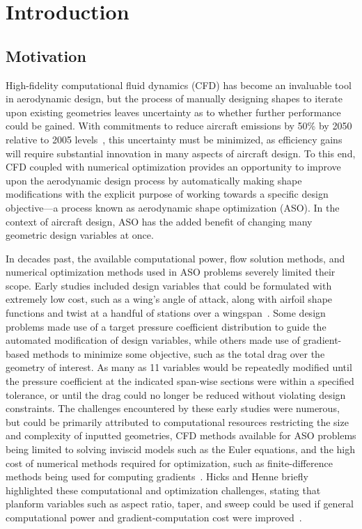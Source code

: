 \chapter{Introduction}
\section{Motivation}
\label{ssec:motivation}
High-fidelity computational fluid dynamics (CFD) has become an invaluable tool in aerodynamic design, but the process of manually designing shapes to iterate upon existing geometries leaves  uncertainty as to whether further performance could be gained. With commitments to reduce aircraft emissions by 50\% by 2050 relative to 2005 levels~\cite{tyler_iata_2014}, this uncertainty must be minimized, as efficiency gains will require substantial innovation in many aspects of aircraft design. To this end, CFD coupled with numerical optimization provides an opportunity to improve upon the aerodynamic design process by automatically making shape modifications with the explicit purpose of working towards a specific design objective—a process known as aerodynamic shape optimization (ASO).
In the context of aircraft design, ASO has the added benefit of changing many geometric design variables at once. \par

In decades past, the available computational power, flow solution methods, and numerical optimization methods used in ASO problems severely limited their scope. Early studies included design variables that could be formulated with extremely low cost, such as a wing's angle of attack, along with airfoil shape functions and twist at a handful of stations over a wingspan~\cite{hicks_wing_1978}. 
Some design problems made use of a target pressure coefficient distribution to guide the automated modification of design variables, while others made use of gradient-based methods to minimize some objective, such as the total drag over the geometry of interest. 
As many as 11 variables would be repeatedly modified until the pressure coefficient at the indicated span-wise sections were within a specified tolerance, or until the drag could no longer be reduced without violating design constraints. 
The challenges encountered by these early studies were numerous, but could be primarily attributed to computational resources restricting the size and complexity of inputted geometries, CFD methods available for ASO problems being limited to solving inviscid models such as the Euler equations, and the high cost of numerical methods required for optimization, such as finite-difference methods being used for computing gradients~\cite{hicks_wing_1978}. 
Hicks and Henne briefly highlighted these computational and optimization challenges, stating that planform variables such as aspect ratio, taper, and sweep could be used if general computational power and gradient-computation cost were improved~\cite{hicks_wing_1978}. \par

